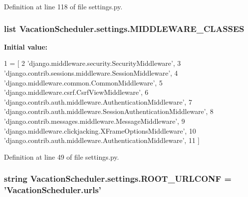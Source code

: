 Definition at line 118 of file settings.\-py.

\hypertarget{namespaceVacationScheduler_1_1settings_a3aaf53b9da3dadabeb977ad8e40805d3}{
\subsubsection[{M\-I\-D\-D\-L\-E\-W\-A\-R\-E\-\_\-\-C\-L\-A\-S\-S\-E\-S}]{\setlength{\rightskip}{0pt plus 5cm}list Vacation\-Scheduler.\-settings.\-M\-I\-D\-D\-L\-E\-W\-A\-R\-E\-\_\-\-C\-L\-A\-S\-S\-E\-S}}\label{namespaceVacationScheduler_1_1settings_a3aaf53b9da3dadabeb977ad8e40805d3}
{\bfseries Initial value\-:}
\begin{DoxyCode}
1 = [
2     \textcolor{stringliteral}{'django.middleware.security.SecurityMiddleware'},
3     \textcolor{stringliteral}{'django.contrib.sessions.middleware.SessionMiddleware'},
4     \textcolor{stringliteral}{'django.middleware.common.CommonMiddleware'},
5     \textcolor{stringliteral}{'django.middleware.csrf.CsrfViewMiddleware'},
6     \textcolor{stringliteral}{'django.contrib.auth.middleware.AuthenticationMiddleware'},
7     \textcolor{stringliteral}{'django.contrib.auth.middleware.SessionAuthenticationMiddleware'},
8     \textcolor{stringliteral}{'django.contrib.messages.middleware.MessageMiddleware'},
9     \textcolor{stringliteral}{'django.middleware.clickjacking.XFrameOptionsMiddleware'},
10     \textcolor{stringliteral}{'django.contrib.auth.middleware.AuthenticationMiddleware'},
11 ]
\end{DoxyCode}


Definition at line 49 of file settings.\-py.

\hypertarget{namespaceVacationScheduler_1_1settings_ab403feea447f53a8dd99f5ec7d1d6147}{
\subsubsection[{R\-O\-O\-T\-\_\-\-U\-R\-L\-C\-O\-N\-F}]{\setlength{\rightskip}{0pt plus 5cm}string Vacation\-Scheduler.\-settings.\-R\-O\-O\-T\-\_\-\-U\-R\-L\-C\-O\-N\-F = 'Vacation\-Scheduler.\-urls'}}\label{namespaceVacationScheduler_1_1settings_ab403feea447f53a8dd99f5ec7d1d6147}


